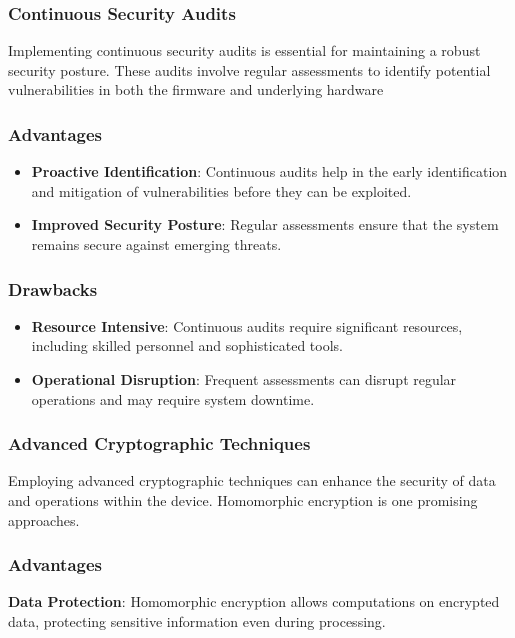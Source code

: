 \subsubsection{Continuous Security Audits}
Implementing continuous security audits is essential for maintaining a robust security posture. These audits involve regular assessments to identify potential vulnerabilities in both the firmware and underlying hardware

\subsubsection{Advantages}

\begin{itemize}
    \item \textbf{Proactive Identification}: Continuous audits help in the early identification and mitigation of vulnerabilities before they can be exploited.
    \item \textbf{Improved Security Posture}: Regular assessments ensure that the system remains secure against emerging threats.
\end{itemize}
\subsubsection{Drawbacks}

\begin{itemize}
    \item \textbf{Resource Intensive}: Continuous audits require significant resources, including skilled personnel and sophisticated tools.
    \item \textbf{Operational Disruption}: Frequent assessments can disrupt regular operations and may require system downtime.
\end{itemize}
\subsubsection{Advanced Cryptographic Techniques}
Employing advanced cryptographic techniques can enhance the security of data and operations within the device. Homomorphic encryption is one promising approaches.

\subsubsection{Advantages}

\textbf{Data Protection}: Homomorphic encryption allows computations on encrypted data, protecting sensitive information even during processing.
